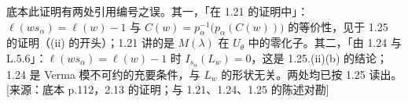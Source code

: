\begin{annote}
底本此证明有两处引用编号之误。其一，「在 1.21 的证明中」：$\ell(ws_\alpha)=\ell(w)-1$ 与 $C(w)=p_\alpha^{-1}\bigl(p_\alpha(C(w))\bigr)$ 的等价性，见于 1.25 的证明（(ii) 的开头）；1.21 讲的是 $M(\lambda)$ 在 $U_\theta$ 中的零化子。其二，「由 1.24 与 L.5.6」：$\ell(ws_\alpha)=\ell(w)-1$ 时 $I_{s_\alpha}(L_w)=0$，这是 1.25.(ii)(b) 的结论；1.24 是 Verma 模不可约的充要条件，与 $L_w$ 的形状无关。两处均已按 1.25 读出。[来源：底本 p.112，2.13 的证明；与 1.21、1.24、1.25 的陈述对勘]
\end{annote}
